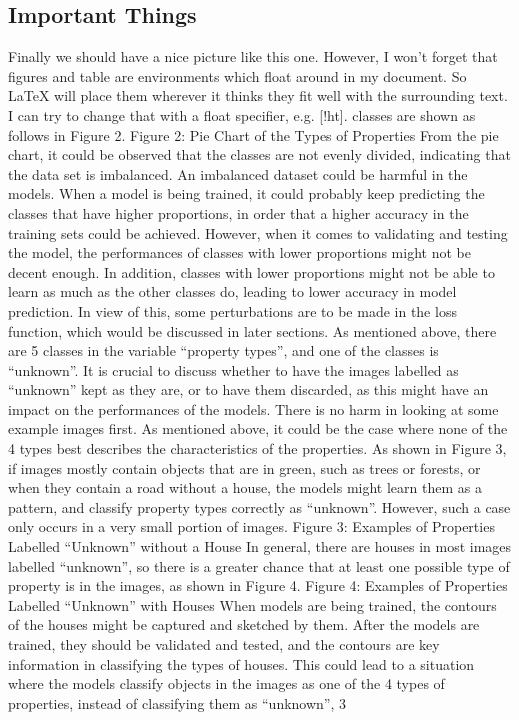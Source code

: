 \documentclass[11pt,twoside]{article}
\numberwithin{Theorem}{section}
\numberwithin{Definition}{section}
\numberwithin{Lemma}{section}
\numberwithin{Algorithm}{section}
\numberwithin{equation}{section}
\begin{document}
\subsection{Important Things}
Finally we should have a nice picture like this one. However, I won't forget that figures and table are environments which float around in my document. So LaTeX will place them wherever it thinks they fit well with the surrounding text. I can try to change that with a float specifier, e.g. [!ht].
classes are shown as follows in Figure 2.
Figure 2: Pie Chart of the Types of Properties
From the pie chart, it could be observed that the classes are not evenly divided, indicating that
the data set is imbalanced. An imbalanced dataset could be harmful in the models. When a model is being trained, it could probably keep predicting the classes that have higher proportions, in order that
a higher accuracy in the training sets could be achieved. However, when it comes to validating and
testing the model, the performances of classes with lower proportions might not be decent enough. In
addition, classes with lower proportions might not be able to learn as much as the other classes do,
leading to lower accuracy in model prediction. In view of this, some perturbations are to be made in
the loss function, which would be discussed in later sections.
As mentioned above, there are 5 classes in the variable “property types”, and one of the classes is
“unknown”. It is crucial to discuss whether to have the images labelled as “unknown” kept as they
are, or to have them discarded, as this might have an impact on the performances of the models.
There is no harm in looking at some example images first. As mentioned above, it could be the case
where none of the 4 types best describes the characteristics of the properties. As shown in Figure 3, if
images mostly contain objects that are in green, such as trees or forests, or when they contain a road
without a house, the models might learn them as a pattern, and classify property types correctly as
“unknown”. However, such a case only occurs in a very small portion of images.
Figure 3: Examples of Properties Labelled “Unknown” without a House
In general, there are houses in most images labelled “unknown”, so there is a greater chance that
at least one possible type of property is in the images, as shown in Figure 4.
Figure 4: Examples of Properties Labelled “Unknown” with Houses
When models are being trained, the contours of the houses might be captured and sketched by
them. After the models are trained, they should be validated and tested, and the contours are key
information in classifying the types of houses. This could lead to a situation where the models classify
objects in the images as one of the 4 types of properties, instead of classifying them as “unknown”,
3
\end{document}
